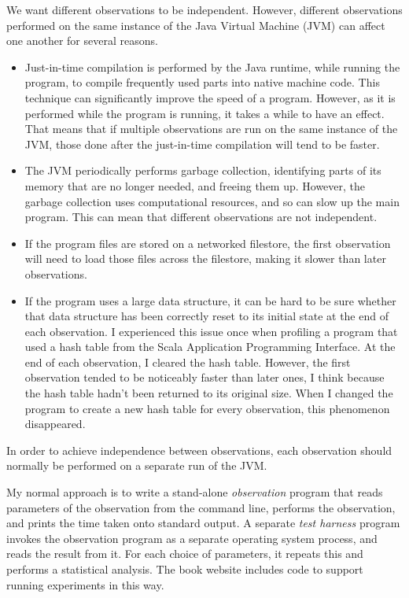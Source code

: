 We want different observations to be independent.  However, different
observations performed on the same instance of the Java Virtual Machine (JVM)
can affect one another for several reasons.
%
\begin{itemize}
\item
Just-in-time compilation is performed by the Java runtime, while running the
program, to compile frequently used parts into native machine code.  This
technique can significantly improve the speed of a program.  However, as it is
performed while the program is running, it takes a while to have an effect.
That means that if multiple observations are run on the same instance of the
JVM, those done after the just-in-time compilation will tend to be faster.

\item
The JVM periodically performs garbage collection, identifying parts of its
memory that are no longer needed, and freeing them up.  However, the garbage
collection uses computational resources, and so can slow up the main program.
This can mean that different observations are not independent.

\item
If the program files are stored on a networked filestore, the first
observation will need to load those files across the filestore, making it
slower than later observations.

\item
If the program uses a large data structure, it can be hard to be sure whether
that data structure has been correctly reset to its initial state at the end
of each observation.  I experienced this issue once when profiling a program
that used a hash table from the Scala Application Programming Interface.  At
the end of each observation, I cleared the hash table.  However, the first
observation tended to be noticeably faster than later ones, I think because
the hash table hadn't been returned to its original size.  When I changed the
program to create a new hash table for every observation, this phenomenon
disappeared. 
\end{itemize}
%
In order to achieve independence between observations, each observation should
normally be performed on a separate run of the JVM.


My normal approach is to write a stand-alone \emph{observation} program that
reads parameters of the observation from the command line, performs the
observation, and prints the time taken onto standard output.
%
A separate \emph{test harness} program invokes the observation program as a
separate operating system process, and reads the result from it.  For each
choice of parameters, it repeats this and performs a statistical analysis.
%
The book website includes code to support running experiments in this way.

